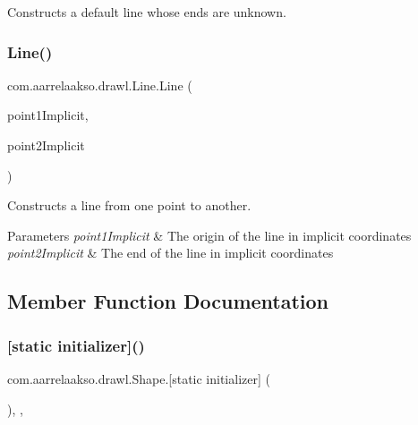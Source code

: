Constructs a default line whose ends are unknown. 

\mbox{\label{classcom_1_1aarrelaakso_1_1drawl_1_1_line_a9e956655eba16543d82728923c3eb4f6}} 
\subsubsection{\texorpdfstring{Line()}{Line()}\hspace{0.1cm}{\footnotesize\ttfamily [2/2]}}
{\footnotesize\ttfamily com.\+aarrelaakso.\+drawl.\+Line.\+Line (\begin{DoxyParamCaption}\item[{@Not\+Null final \hyperlink{classcom_1_1aarrelaakso_1_1drawl_1_1_point}{Point}}]{point1\+Implicit,  }\item[{@Not\+Null final \hyperlink{classcom_1_1aarrelaakso_1_1drawl_1_1_point}{Point}}]{point2\+Implicit }\end{DoxyParamCaption})}



Constructs a line from one point to another. 


\begin{DoxyParams}{Parameters}
{\em point1\+Implicit} & The origin of the line in implicit coordinates \\
\hline
{\em point2\+Implicit} & The end of the line in implicit coordinates \\
\hline
\end{DoxyParams}


\subsection{Member Function Documentation}
\mbox{\label{classcom_1_1aarrelaakso_1_1drawl_1_1_shape_ad2adcb85374cf5d6d59429628314e8d1}} 
\subsubsection{\texorpdfstring{[static initializer]()}{[static initializer]()}}
{\footnotesize\ttfamily com.\+aarrelaakso.\+drawl.\+Shape.\mbox{[}static initializer\mbox{]} (\begin{DoxyParamCaption}{ }\end{DoxyParamCaption})\hspace{0.3cm}{\ttfamily [static]}, {\ttfamily [package]}, {\ttfamily [inherited]}}

